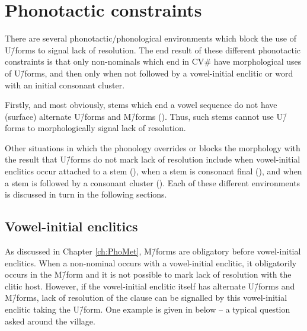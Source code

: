 \section{Phonotactic constraints}\label{sec:PhoCon}
There are several phonotactic/phonological environments
which block the use of U\=/forms to signal lack of resolution.
The end result of these different phonotactic constraints
is that only non-nominals which end in CV{\#}
have morphological uses of U\=/forms, and then only
when not followed by a vowel-initial enclitic or
word with an initial consonant cluster.

Firstly, and most obviously, stems which end a vowel
sequence do not have (surface) alternate
U\=/forms and M\=/forms ().
Thus, such stems cannot use U\=/forms to
morphologically signal lack of resolution.

Other situations in which the phonology overrides or blocks
the morphology with the result that U\=/forms do not mark lack of resolution
include when vowel-initial enclitics occur attached to a stem (),
when a stem is consonant final (),
and when a stem is followed by a consonant cluster ().
Each of these different environments is discussed in turn in the following sections.

\subsection{Vowel-initial enclitics}\label{sec:PhoCon sec:VowIniEnc}
As discussed in Chapter \ref{ch:PhoMet},
M\=/forms are obligatory before vowel-initial enclitics.
When a non-nominal occurs with a vowel-initial enclitic,
it obligatorily occurs in the M\=/form and it is
not possible to mark lack of resolution with the clitic host.
However, if the vowel-initial enclitic itself has alternate
U\=/forms and M\=/forms, lack of resolution of the clause can
be signalled by this vowel-initial enclitic taking the U\=/form.
One example is given in  below
-- a typical question asked around the village.

\begin{exe}
	\label{ex:HooMfaanJena}
\end{exe}

